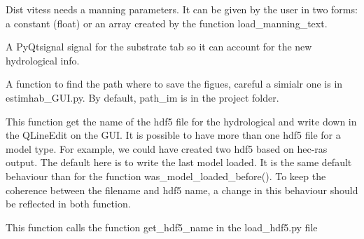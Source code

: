 \documentclass[letterpaper,10pt,english]{sphinxmanual}
\begin{document}
\begin{fulllineitems}
\begin{fulllineitems}
Dist vitess needs a manning parameters. It can be given by the user in two forms: a constant (float) or an array
created by the function load\_manning\_text.

\end{fulllineitems}


\begin{fulllineitems}
\label{\detokenize{index:src_GUI.hydro_GUI_2.SubHydroW.drop_hydro}}
A PyQtsignal signal for the substrate tab so it can account for the new hydrological info.

\end{fulllineitems}


\begin{fulllineitems}
\label{\detokenize{index:src_GUI.hydro_GUI_2.SubHydroW.find_path_im}}
A function to find the path where to save the figues, careful a simialr one is in estimhab\_GUI.py. By default,
path\_im is in the project folder.

\end{fulllineitems}


\begin{fulllineitems}
\label{\detokenize{index:src_GUI.hydro_GUI_2.SubHydroW.gethdf5_name_gui}}
This function get the name of the hdf5 file for the hydrological and write down in the QLineEdit on the GUI.
It is possible to have more than one hdf5 file for a model type. For example, we could have created two hdf5
based on hec-ras output. The default here is to write the last model loaded. It is the same default behaviour
than for the function was\_model\_loaded\_before(). To keep the coherence between the filename and hdf5 name,
a change in this behaviour should be reflected in both function.

This function calls the function get\_hdf5\_name in the load\_hdf5.py file

\end{fulllineitems}



\end{fulllineitems}
\end{document}
